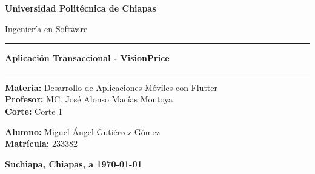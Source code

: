 \documentclass[12pt, a4paper]{article} %
\newcommand{\nombreuniversidad}{Universidad Politécnica de Chiapas}
\newcommand{\nombrecarrera}{Ingeniería en Software}
\newcommand{\nombremateria}{Desarrollo de Aplicaciones Móviles con Flutter}
\newcommand{\nombreprofesor}{MC. José Alonso Macías Montoya}
\newcommand{\corte}{Corte 1}
\newcommand{\actividad}{Aplicación Transaccional - VisionPrice}
\newcommand{\nombres}{Miguel Ángel Gutiérrez Gómez}
\newcommand{\matricula}{233382}
\newcommand{\fechaentrega}{\today} %
\newcommand{\ciudad}{Suchiapa, Chiapas}
\begin{document}
\begin{titlepage}
    \centering
    \vspace*{1cm} %
    {\Huge\bfseries \nombreuniversidad \par} %
    \vspace{0.5cm}
    {\Large \nombrecarrera \par} %

    \vspace{2cm}
    \rule{\textwidth}{1.5pt} %
    \vspace{0.4cm}
    {\Large\bfseries \actividad \par} %
    \vspace{0.4cm}
    \rule{\textwidth}{1.5pt} %

    \vspace{3cm}

    \begin{flushleft}
        \centering %
        \textbf{Materia:} \nombremateria \\
        \textbf{Profesor:} \nombreprofesor \\
        \textbf{Corte:} \corte
    \end{flushleft}

    \vspace{0.5cm} %

    \begin{flushleft}
        \centering %
        \textbf{Alumno:} \nombres \\
        \textbf{Matrícula:} \matricula \\
    \end{flushleft}

    \vfill %

    \vspace{1cm}
    \textbf{\ciudad, a \fechaentrega}

\end{titlepage}

\clearpage %

\tableofcontents
\clearpage
\end{document}
